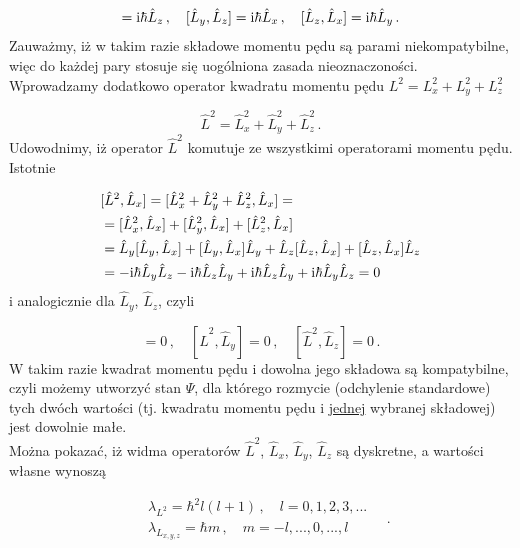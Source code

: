 \documentclass{myclass}
\begin{document}
\begin{equation*}
        [\hat{L}_x,\hat{L}_y]=\im\hbar\hat{L}_z\,,\quad [\hat{L}_y,\hat{L}_z]=\im\hbar\hat{L}_x\,,\quad[\hat{L}_z,\hat{L}_x]=\im\hbar\hat{L}_y\,.
\end{equation*}
Zauważmy, iż w takim razie składowe momentu pędu są parami niekompatybilne, więc do każdej pary
stosuje się uogólniona zasada nieoznaczoności.\\

Wprowadzamy dodatkowo operator kwadratu momentu pędu \(L^2=L_x^2+L_y^2+L_z^2\)

\begin{equation*}
    \hat{L}^2=\hat{L}_x^2+\hat{L}_y^2+\hat{L}_z^2\,.
\end{equation*}
Udowodnimy, iż operator \(\hat{L}^2\) komutuje ze wszystkimi operatorami momentu pędu. Istotnie

\begin{equation*}
\begin{split}
    &[\hat{L}^2,\hat{L}_x]=[\hat{L}_x^2+\hat{L}_y^2+\hat{L}_z^2,\hat{L}_x]=\\
    &=[\hat{L}_x^2,\hat{L}_x]+[\hat{L}_y^2,\hat{L}_x]+[\hat{L}_z^2,\hat{L}_x]\\
    &=\hat{L}_y[\hat{L}_y,\hat{L}_x]+[\hat{L}_y,\hat{L}_x]\hat{L}_y+\hat{L}_z[\hat{L}_z,\hat{L}_x]+[\hat{L}_z,\hat{L}_x]\hat{L}_z\\
    &=-\mathrm{i}\hbar\hat{L}_y\hat{L}_z-\mathrm{i}\hbar\hat{L}_z\hat{L}_y+\mathrm{i}\hbar\hat{L}_z\hat{L}_y+\mathrm{i}\hbar\hat{L}_y\hat{L}_z=0
\end{split}
\end{equation*}
i analogicznie dla \(\hat{L}_y\), \(\hat{L}_z\), czyli

\begin{equation*}
        [\hat{L}^2,\hat{L}_x]=0\,,\quad[\hat{L}^2,\hat{L}_y]=0\,,\quad [\hat{L}^2,\hat{L}_z]=0\,.
\end{equation*}
W takim razie kwadrat momentu pędu i dowolna jego składowa są kompatybilne, czyli możemy utworzyć
stan \(\Psi\), dla którego rozmycie (odchylenie standardowe) tych dwóch wartości (tj. kwadratu
momentu pędu i \underline{jednej} wybranej składowej) jest dowolnie małe.\\

Można pokazać, iż widma operatorów \(\hat{L}^2\), \(\hat{L}_x\), \(\hat{L}_y\), \(\hat{L}_z\) są
dyskretne, a wartości własne wynoszą

\begin{equation*}
\begin{split}
    &\lambda_{L^2}=\hbar^2l(l+1)\,,\quad l=0,1,2,3,...\\
    &\lambda_{L_{x,y,z}}=\hbar m\,,\quad m=-l,...,0,...,l
\end{split}\quad.
\end{equation*}
\end{document}

